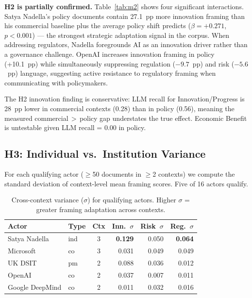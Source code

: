 \documentclass[11pt,a4paper,twocolumn]{article}
\begin{document}
\textbf{H2 is partially confirmed.} Table~\ref{tab:m2} shows four significant
interactions. Satya Nadella's policy documents contain 27.1~pp more innovation
framing than his commercial baseline plus the average policy shift predicts
($\beta = +0.271$, $p < 0.001$) — the strongest strategic adaptation signal
in the corpus. When addressing regulators, Nadella foregrounds AI as an
innovation driver rather than a governance challenge. OpenAI increases
innovation framing in policy (+10.1~pp) while simultaneously suppressing
regulation ($-9.7$~pp) and risk ($-5.6$~pp) language, suggesting active
resistance to regulatory framing when communicating with policymakers.

The H2 innovation finding is conservative: LLM recall for Innovation/Progress
is 28~pp lower in commercial contexts (0.28) than in policy (0.56), meaning the
measured commercial$\,{>}\,$policy gap understates the true effect. Economic
Benefit is untestable given LLM recall = 0.00 in policy.

\subsection{H3: Individual vs.\ Institution Variance}

For each qualifying actor ($\geq$50 documents in $\geq$2 contexts) we compute
the standard deviation of context-level mean framing scores. Five of 16 actors
qualify.

\begin{table}[t]
\centering
\caption{Cross-context variance ($\sigma$) for qualifying actors.
         Higher $\sigma$ = greater framing adaptation across contexts.}
\label{tab:variance}
\small
\setlength{\tabcolsep}{4pt}
\begin{tabular}{llcrrr}
\toprule
\textbf{Actor} & \textbf{Type} & \textbf{Ctx} &
  \textbf{Inn.~$\sigma$} & \textbf{Risk~$\sigma$} & \textbf{Reg.~$\sigma$} \\
\midrule
Satya Nadella   & ind & 3 & \textbf{0.129} & 0.050 & \textbf{0.064} \\
Microsoft       & co  & 3 & 0.031 & 0.049 & 0.049 \\
UK DSIT         & pm  & 2 & 0.088 & 0.036 & 0.012 \\
OpenAI          & co  & 2 & 0.037 & 0.007 & 0.011 \\
Google DeepMind & co  & 2 & 0.011 & 0.032 & 0.016 \\
\bottomrule
\end{tabular}
\end{table}
\end{document}
